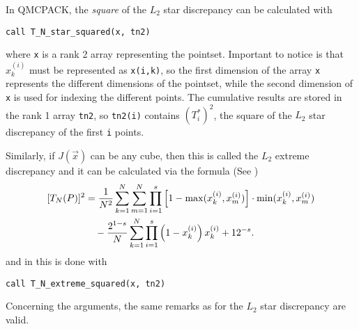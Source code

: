 In QMCPACK, the \emph{square} of the $L_2$ star discrepancy can be calculated
with
\begin{lstlisting}
call T_N_star_squared(x, tn2)
\end{lstlisting}
where \verb!x! is a rank 2 array representing the pointset.  Important to notice is that $x_k^{(i)}$ must be represented as \verb|x(i,k)|, so the first
dimension of the array
\verb|x| represents the different dimensions of the pointset, while the second
dimension of \verb!x! is used for indexing the different points.
The cumulative results are stored in the rank 1 array \verb!tn2!, so
\verb!tn2(i)! contains $(T_i^*)^2$, the square of the $L_2$ star discrepancy
of the first \verb!i! points.

Similarly, if $J(\vec{x})$ can be any cube, then this is called the $L_2$
extreme discrepancy and it can be calculated via the formula (See
\cite{morokoff94caflish})
\begin{align} \label{eq:t_n_extreme}
[T_N(P)]^2 &=
  \frac{1}{N^2}\sum_{k=1}^N\sum_{m=1}^N\prod_{i=1}^s\left[1-\max(x_k^{(i)},x_m^{(i)})\right] \cdot \min(x_k^{(i)},x_m^{(i)}) \notag \\
           & \quad
  - \frac{2^{1-s}}{N} \sum_{k=1}^{N} \prod_{i=1}^s\left(1-{x_k^{(i)}}\right)x_k^{(i)} + 12^{-s}.
\end{align}
and in \qmcpack{} this is done with
\begin{lstlisting}
call T_N_extreme_squared(x, tn2)
\end{lstlisting}
Concerning the arguments, the same remarks as for the $L_2$ star discrepancy
are valid.
